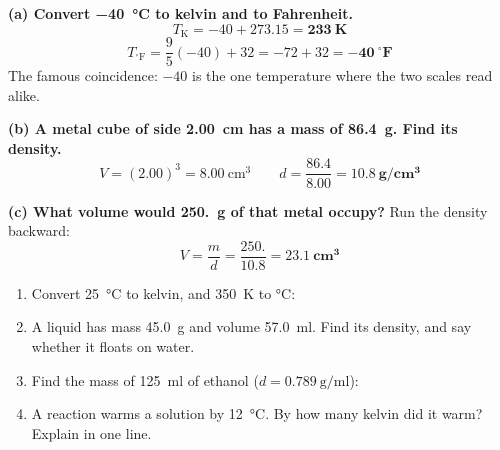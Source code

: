 \documentclass{apchem-worksheet}
\begin{document}
\begin{workedexample}
\textbf{(a) Convert \SI{-40}{\celsius} to kelvin and to Fahrenheit.}
\[ T_{\text{K}} = -40 + 273.15 = \mathbf{233~K} \]
\[ T_{^\circ\text{F}} = \frac{9}{5}(-40) + 32 = -72 + 32 =
   \mathbf{-40~^\circ F} \]
The famous coincidence: $-40$ is the one temperature where the two
scales read alike.

\textbf{(b) A metal cube of side \SI{2.00}{\centi\meter} has a mass of
\SI{86.4}{\gram}. Find its density.}
\[ V = (2.00)^3 = \SI{8.00}{\centi\meter\cubed} \qquad
   d = \frac{86.4}{8.00} = \mathbf{10.8~g/cm^3} \]

\textbf{(c) What volume would \SI{250.}{\gram} of that metal occupy?}
Run the density backward:
\[ V = \frac{m}{d} = \frac{250.}{10.8} = \mathbf{23.1~cm^3} \]
\end{workedexample}

\begin{yourturn}
\begin{enumerate}[leftmargin=*,itemsep=0.5em]
  \item Convert \SI{25}{\celsius} to kelvin, and \SI{350}{\kelvin} to
        \si{\celsius}: \workspace[1.4cm]
  \item A liquid has mass \SI{45.0}{\gram} and volume
        \SI{57.0}{\milli\litre}. Find its density, and say whether it
        floats on water. \workspace[1.6cm]
  \item Find the mass of \SI{125}{\milli\litre} of ethanol
        ($d = \SI{0.789}{\gram\per\milli\litre}$): \workspace[1.6cm]
  \item A reaction warms a solution by \SI{12}{\celsius}. By how many
        kelvin did it warm? Explain in one line. \workspace[1.4cm]
\end{enumerate}
\end{yourturn}
\end{document}
